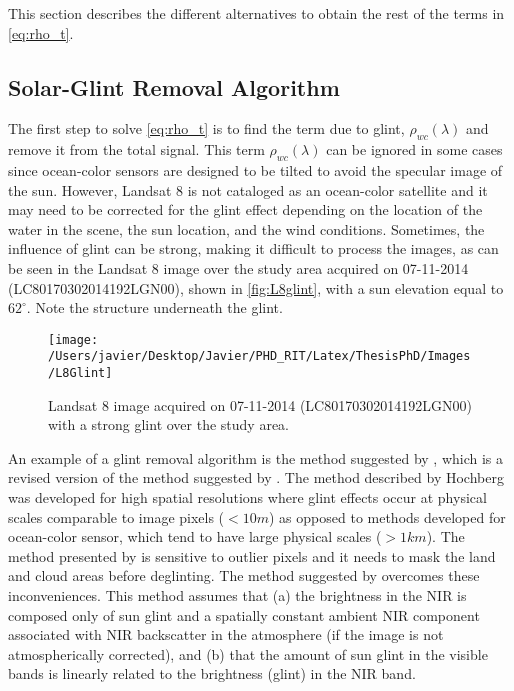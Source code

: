 This section describes the different alternatives to obtain the rest of the terms in \autoref{eq:rho_t}.

\subsection{Solar-Glint Removal Algorithm}
\label{subsec:glintremoval}
The first step to solve \autoref{eq:rho_t} is to find the term due to glint, $\rho_{wc}(\lambda)$ and remove it from the total signal. This term $\rho_{wc}(\lambda)$ can be ignored in some cases since ocean-color sensors are designed to be tilted to avoid the specular image of the sun. However, Landsat 8 is not cataloged as an ocean-color satellite and it may need to be corrected for the glint effect depending on the location of the water in the scene, the sun location, and the wind conditions. Sometimes, the influence of glint can be strong, making it difficult to process the images, as can be seen in the Landsat 8 image over the study area acquired on 07-11-2014 (LC80170302014192LGN00), shown in \autoref{fig:L8glint}, with a sun elevation equal to $62^\circ$. Note the structure underneath the glint.
\begin{figure}[htb]
  \centering
    \texttt{[image: /Users/javier/Desktop/Javier/PHD\_RIT/Latex/ThesisPhD/Images/L8Glint]}
    \caption{Landsat 8 image acquired on 07-11-2014 (LC80170302014192LGN00) with a strong glint over the study area.  \label{fig:L8glint} }
\end{figure}

An example of a glint removal algorithm is the method suggested by \citet{Hedley:2005}, which is a revised version of the method suggested by \citet{Hochberg:2003}. The method described by Hochberg was developed for high spatial resolutions where glint effects occur at physical scales comparable to image pixels ($<10m$) as opposed to methods developed for ocean-color sensor, which tend to have large physical scales ($>1km$).
The method presented by \citet{Hochberg:2003} is sensitive to outlier pixels and it needs to mask the land and cloud areas before deglinting. The method suggested by \citet{Hedley:2005} overcomes these inconveniences. This method assumes that (a) the brightness in the NIR is composed only of sun glint and a spatially constant ambient NIR component associated with NIR backscatter in the atmosphere (if the image is not atmospherically corrected), and (b) that the amount of sun glint in the visible bands is linearly related to the brightness (glint) in the NIR band. 

